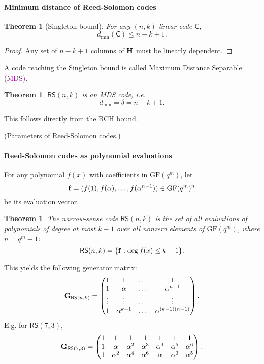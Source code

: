 \documentclass[a4paper, 11pt, openany]{book}
\numberwithin{equation}{section}
\theoremstyle{plain}
\newtheorem{theorem}	[equation]	{Theorem}
\theoremstyle{definition}
\newcommand{\GF}{\mathrm{GF}}
\newcommand{\Define}[1]{\textcolor{purple}{#1}}
\newcommand{\code}[1]{\mathsf{#1}}
\newcommand{\ReedSolomon}           {\code{RS}}
\begin{document}
\paragraph{Minimum distance of Reed-Solomon codes}

\begin{theorem}[Singleton bound] For any $(n,k)$ linear code $\code{C}$, 
\[
	d_{\min}(\code{C}) \le n-k+1.
\]
\end{theorem}

\begin{proof} 
Any set of $n-k+1$ columns of ${\bf H}$ must be linearly dependent.
\end{proof}

A code reaching the Singleton bound is called Maximum Distance Separable \Define{(MDS)}.

\begin{theorem} 
$\ReedSolomon(n,k)$ is an MDS code, i.e.
\[
	d_{\min} = \delta = n - k +1.
\]
\end{theorem}

This follows directly from the BCH bound.

(Parameters of Reed-Solomon codes.)

\paragraph{Reed-Solomon codes as polynomial evaluations}

For any polynomial $f(x)$ with coefficients in $\GF(q^m)$, let 
\[
    {\bf f} = (f(1), f(\alpha), \ldots, f(\alpha^{n-1})) \in \GF(q^m)^n
\]
be its evaluation vector.

\begin{theorem} 
The narrow-sense code $\ReedSolomon(n,k)$ is the set of all evaluations of polynomials of degree at most $k-1$ over all nonzero elements of $\GF(q^m)$, where $n=q^m-1$:
\[
	\ReedSolomon(n,k) = \{{\bf f} : \deg f(x) \le k-1\}.
\]
\end{theorem}

This yields the following generator matrix:
\[
	{\bf G}_{\ReedSolomon(n,k)} = \begin{pmatrix}
	1 & 1 & \dots & 1\\
	1 & \alpha & \dots & \alpha^{n-1}\\
	\vdots & \vdots & \dots & \vdots\\
	1 & \alpha^{k-1} & \dots & \alpha^{(k-1)(n-1)}
	\end{pmatrix}.
\]
E.g. for $\ReedSolomon(7,3)$,
\[
	{\bf G}_{\ReedSolomon(7,3)} = \begin{pmatrix}
	1 & 1 & 1 & 1 & 1 & 1 & 1\\
	1 & \alpha & \alpha^2 & \alpha^3 & \alpha^4 & \alpha^5 & \alpha^6\\
	1 & \alpha^2 & \alpha^4 & \alpha^6 & \alpha & \alpha^3 & \alpha^5
	\end{pmatrix}.
\]
\end{document}
